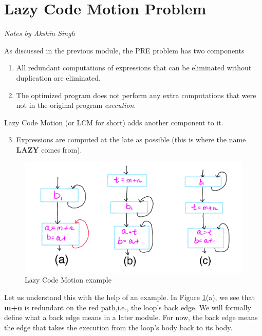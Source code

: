 \section{Lazy Code Motion Problem}
\begin{flushright}
\textit{Notes by Akshin Singh}
\end{flushright}

As discussed in the previous module, the PRE problem has two components
\begin{enumerate}
\item All redundant computations of expressions that can be eliminated without duplication are eliminated.
\item The optimized program does not perform any extra computations that were not in the original program \textit{execution}.
\end{enumerate}

Lazy Code Motion (or LCM for short) adds another component to it.

\begin{enumerate}
  \setcounter{enumi}{2}
\item Expressions are computed at the late as possible (this is where the name \textbf{LAZY} comes from).
\end{enumerate}


\begin{figure}[h]
\centering
\includegraphics[scale = 0.5]{images/mod_106_fig1.png}
\caption{Lazy Code Motion example}
\label {fig:mod_106_01}
\end{figure}

Let us understand this with the help of an example. In Figure \ref{fig:mod_106_01}(a), we see that \textbf{m+n} is redundant on the red path,i.e., the loop's back edge. We will formally define what a back edge means in a later module. For now, the back edge means the edge that takes the execution from the loop's body back to its body.

